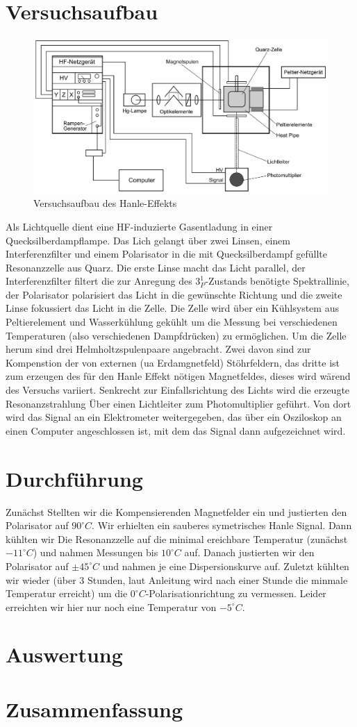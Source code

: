 \documentclass[12pt]{article}
\begin{document}
\section{Versuchsaufbau}
\begin{figure}[H]  
\centering
\includegraphics[width=0.7\linewidth]{pictures/Aufbau.ps}
\caption{Versuchsaufbau des Hanle-Effekts}
\end{figure}

Als Lichtquelle dient eine HF-induzierte Gasentladung in einer Quecksilberdampflampe. Das Lich gelangt über zwei Linsen, einem Interferenzfilter und einem Polarisator in die mit Quecksilberdampf gefüllte Resonanzzelle aus Quarz. Die erste Linse macht das Licht parallel, der Interferenzfilter filtert die zur Anregung des $3_P^1$-Zustands benötigte Spektrallinie, der Polarisator polarisiert das Licht in die gewünschte Richtung und die zweite Linse fokussiert das Licht in die Zelle. Die Zelle wird über ein Kühlsystem aus Peltierelement und Wasserkühlung gekühlt um die Messung bei verschiedenen Temperaturen (also verschiedenen Dampfdrücken) zu ermöglichen. Um die Zelle herum sind drei Helmholtzspulenpaare angebracht. Zwei davon sind zur Kompenstion der von externen (ua Erdamgnetfeld) Stöhrfeldern, das dritte ist zum erzeugen des für den Hanle Effekt nötigen Magnetfeldes, dieses wird wärend des Versuchs variiert. Senkrecht zur Einfallsrichtung des Lichts wird die erzeugte Resonanzstrahlung Über einen Lichtleiter zum Photomultiplier geführt. Von dort wird das Signal an ein Elektrometer weitergegeben, das über ein Osziloskop an einen Computer angeschlossen ist, mit dem das Signal dann aufgezeichnet wird.
\newpage

\section{Durchführung}
Zunächst Stellten wir die Kompensierenden Magnetfelder ein und justierten den Polarisator auf $90^\circ C$. Wir erhielten ein sauberes symetrisches Hanle Signal. Dann kühlten wir Die Resonanzzelle auf die minimal ereichbare Temperatur (zunächst $-11^\circ C$) und nahmen Messungen bis $10^\circ C$ auf. Danach justierten wir den Polarisator auf $\pm 45^\circ C$ und nahmen je eine Dispersionskurve auf. Zuletzt kühlten wir wieder (über 3 Stunden, laut Anleitung wird nach einer Stunde die minmale Temperatur erreicht) um die $0^\circ C$-Polarisationrichtung zu vermessen. Leider erreichten wir hier nur noch eine Temperatur von $-5^\circ C$. 
\section{Auswertung}

\section{Zusammenfassung}
\end{document}

